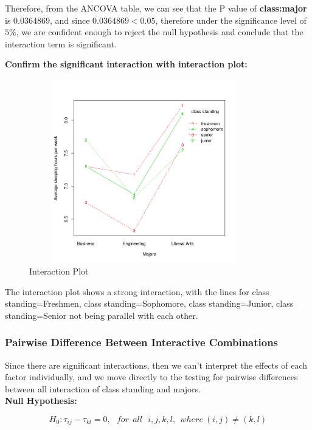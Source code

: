 \documentclass{article} %
\begin{document}
 Therefore, from the ANCOVA table, we can see that the P value of \textbf{class:major} is 0.0364869, and since $0.0364869 < 0.05$, therefore under the significance level of $5\%$, we are confident enough to reject the null hypothesis and conclude that the interaction term is significant.
\newpage

\textbf{Confirm the significant interaction with interaction plot:}

\begin{figure}[H]
	\begin{center}
		\includegraphics[height=8cm, width=10cm]{8.png}
	\end{center}
	\caption{Interaction Plot}
\end{figure}

The interaction plot shows a strong interaction, with the lines for class standing=Freshmen, class standing=Sophomore, class standing=Junior, class standing=Senior not being parallel with each other. 


\subsubsection{Pairwise Difference Between Interactive Combinations}

Since there are significant interactions, then we can't interpret the effects of each factor individually, and we move directly to the testing for pairwise differences between all interaction of class standing and majors.\\


\textbf{Null Hypothesis:}

$$H_0 : \tau_{ij} - \tau_{kl} = 0, \:\:\: for \:\: all \:\:\: i, j, k, l, \:\: where \: (i,j) \neq (k,l)$$
\end{document}
